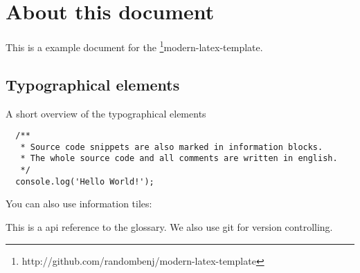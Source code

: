 \documentclass[oneside]{modern}
\begin{document}
  \section*{About this document}

  This is a example document for the
  \footnote{http://github.com/randombenj/modern-latex-template}{modern-latex-template}.

  \subsection*{Typographical elements}

  A short overview of the typographical elements

  \begin{verbatim}
  /**
   * Source code snippets are also marked in information blocks.
   * The whole source code and all comments are written in english.
   */
  console.log('Hello World!');
  \end{verbatim}

  You can also use information tiles:


  This is a \gls{api} reference to the glossary.
  We also use \gls{git} for version controlling.
\end{document}
